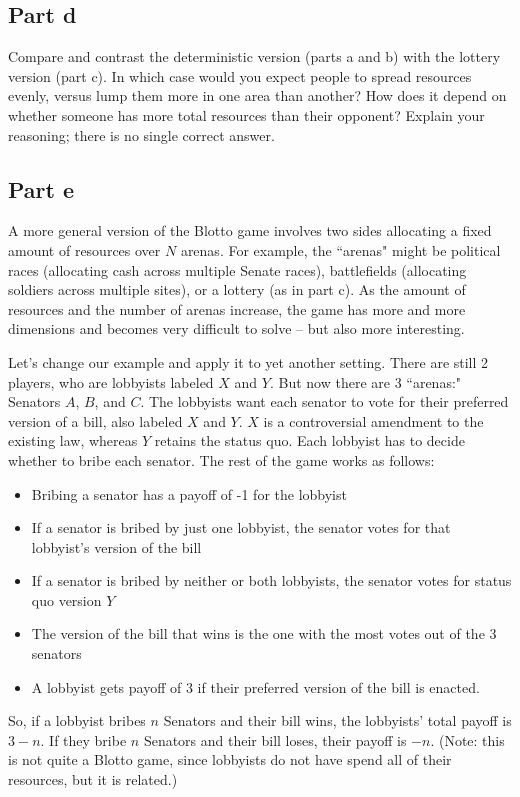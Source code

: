 \documentclass[10pt]{article}
\begin{document}
\newpage

\subsection*{Part d} Compare and contrast the deterministic version (parts a and b) with the lottery version (part c). In which case would you expect people to spread resources evenly, versus lump them more in one area than another? How does it depend on whether someone has more total resources than their opponent? Explain your reasoning; there is no single correct answer.

\newpage

\subsection*{Part e}

A more general version of the Blotto game involves two sides allocating a fixed amount of resources over $N$ arenas. For example, the ``arenas" might be political races (allocating cash across multiple Senate races), battlefields (allocating soldiers across multiple sites), or a lottery (as in part c). As the amount of resources and the number of arenas increase, the game has more and more dimensions and becomes very difficult to solve -- but also more interesting.

Let's change our example and apply it to yet another setting. There are still 2 players, who are lobbyists labeled $X$ and $Y$. But now there are 3 ``arenas:" Senators $A$, $B$, and $C$. The lobbyists want each senator to vote for their preferred version of a bill, also labeled $X$ and $Y$. $X$ is a controversial amendment to the existing law, whereas $Y$ retains the status quo. Each lobbyist has to decide whether to bribe each senator. The rest of the game works as follows:
\begin{itemize}
\item Bribing a senator has a payoff of -1 for the lobbyist
\item If a senator is bribed by just one lobbyist, the senator votes for that lobbyist's version of the bill
\item If a senator is bribed by neither or both lobbyists, the senator votes for status quo version $Y$
\item The version of the bill that wins is the one with the most votes out of the 3 senators
\item A lobbyist gets payoff of 3 if their preferred version of the bill is enacted.
\end{itemize}
So, if a lobbyist bribes $n$ Senators and their bill wins, the lobbyists' total payoff is $3-n$. If they bribe $n$ Senators and their bill loses, their payoff is $-n$. (Note: this is not quite a Blotto game, since lobbyists do not have spend all of their resources, but it is related.)
\end{document}
